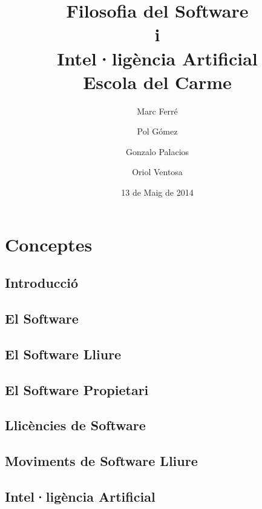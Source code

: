 \documentclass[a4paper,12pt]{report}
\begin{document}


\title{
	{\bf Filosofia del Software\\ i \\Intel·ligència Artificial} \\
	{\vspace{6mm}Escola del Carme}
}
\author{
	Marc Ferré \and
	Pol Gómez \and
	Gonzalo Palacios \and
	Oriol Ventosa
}
\date{13 de Maig de 2014}

\maketitle

\tableofcontents

\part{Conceptes}

\chapter{Introducció}


\chapter{El Software}


\chapter{El Software Lliure}


\chapter{El Software Propietari}


\chapter{Llicències de Software}


\chapter{Moviments de Software Lliure}


\chapter{Intel·ligència Artificial}

\end{document}
